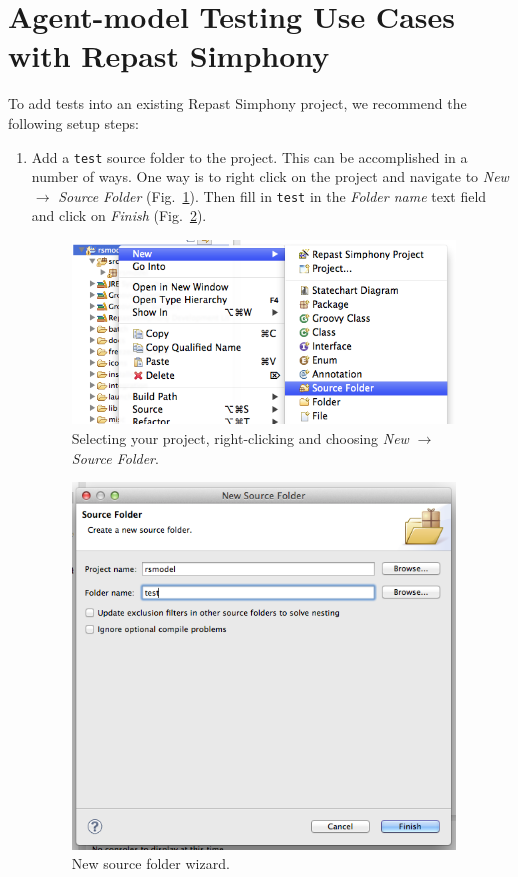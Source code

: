 \documentclass[11pt]{amsart}
\begin{document}
\section{Agent-model Testing Use Cases with Repast Simphony}
To add tests into an existing Repast Simphony project, we recommend the following setup steps:
\begin{enumerate}
\item
Add a \texttt{test} source folder to the project. This can be accomplished in a number of ways. One way is to right click on the project and navigate to \emph{New} $\rightarrow$ \emph{Source Folder} (Fig.~\ref{fig:newSourceFolder}). Then fill in \texttt{test} in the \emph{Folder name} text field and click on \emph{Finish} (Fig.~\ref{fig:testSourceFolder}).

\begin{figure}
\begin{center}
\vspace{.2in}
\centerline {
\includegraphics[width=4in]{RepastModelTestingImages/NewSourceFolder.png}
}
\caption{Selecting your project, right-clicking and choosing \emph{New} $\rightarrow$ \emph{Source Folder}.}
\label{fig:newSourceFolder}
\end{center}
\end{figure}

\begin{figure}
\begin{center}
\vspace{.2in}
\centerline {
\includegraphics[width=4in]{RepastModelTestingImages/testSourceFolder.png}
}
\caption{New source folder wizard.}
\label{fig:testSourceFolder}
\end{center}
\end{figure}


\end{enumerate}
\end{document}
